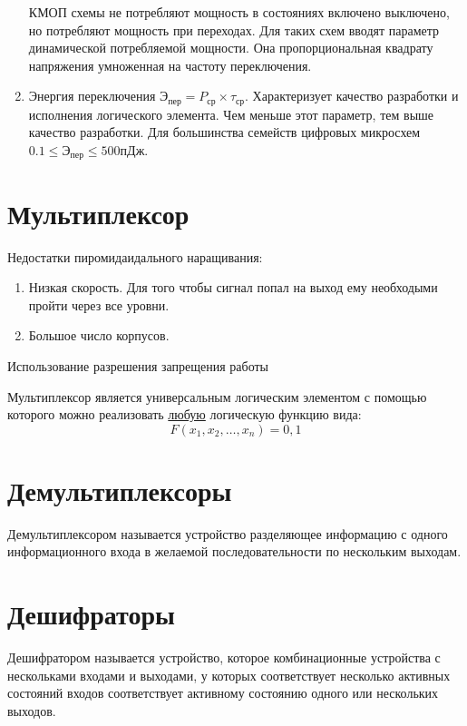 \documentclass{article}
\begin{document}
\begin{enumerate}
	КМОП схемы не потребляют мощность в состояниях включено выключено, но потребляют мощность при переходах. Для таких схем вводят параметр динамической потребляемой мощности.
	Она пропорциональная квадрату напряжения умноженная на частоту переключения.
	\item Энергия переключения $Э_{пер} = P_{ср} \times \tau_{ср}$. Характеризует качество разработки и исполнения логического элемента. Чем меньше этот параметр, тем выше качество разработки.
	Для большинства семейств цифровых микросхем $0.1 \le Э_{пер} \le 500 пДж$.
\end{enumerate}

\section{Мультиплексор}

Недостатки пиромидаидального наращивания:
\begin{enumerate}
	\item Низкая скорость. Для того чтобы сигнал попал на выход ему необходыми пройти через все уровни.
	\item Большое число корпусов.
\end{enumerate}

Использование разрешения запрещения работы

Мультиплексор является универсальным логическим элементом с помощью которого можно реализовать \underline{любую} логическую функцию вида:
$$
F(x_1, x_2, \dots, x_n) = {0, 1}
$$

\section{Демультиплексоры}

Демультиплексором называется устройство разделяющее информацию с одного информационного входа в желаемой последовательности по нескольким выходам.

\section{Дешифраторы}

Дешифратором называется устройство, которое комбинационные устройства с нескольками входами и выходами, у которых соответствует несколько активных состояний входов соответствует активному состоянию одного или нескольких выходов.
\end{document}
